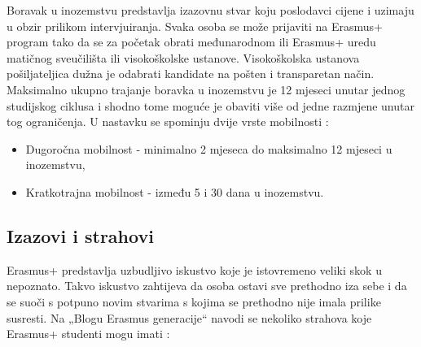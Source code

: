 \documentclass[]{foi}
\begin{document}
Boravak u inozemstvu predstavlja izazovnu stvar koju poslodavci cijene i uzimaju u obzir prilikom intervjuiranja. 
Svaka osoba se može prijaviti na Erasmus+ program tako da se za početak obrati međunarodnom ili Erasmus+ uredu matičnog sveučilišta ili visokoškolske ustanove. 
Visokoškolska ustanova pošiljateljica dužna je odabrati kandidate na pošten i transparetan način. Maksimalno ukupno trajanje boravka u inozemstvu je 12 mjeseci 
unutar jednog studijskog ciklusa i shodno tome moguće je obaviti više od jedne razmjene unutar tog ograničenja. U nastavku se spominju dvije vrste mobilnosti \cite{erasmus2025abroad}:
\begin{itemize}
    \item Dugoročna mobilnost - minimalno 2 mjeseca do maksimalno 12 mjeseci u inozemstvu,
    \item Kratkotrajna mobilnost - između 5 i 30 dana u inozemstvu.    
\end{itemize}

\subsection{Izazovi i strahovi}
Erasmus+ predstavlja uzbudljivo iskustvo koje je istovremeno veliki skok u nepoznato. Takvo iskustvo zahtijeva da osoba ostavi sve prethodno iza sebe i da se suoči s potpuno novim 
stvarima s kojima se prethodno nije imala prilike susresti. Na „Blogu Erasmus generacije“ navodi se nekoliko strahova koje Erasmus+ studenti mogu imati \cite{erasmus_fears_2025}:
\end{document}
